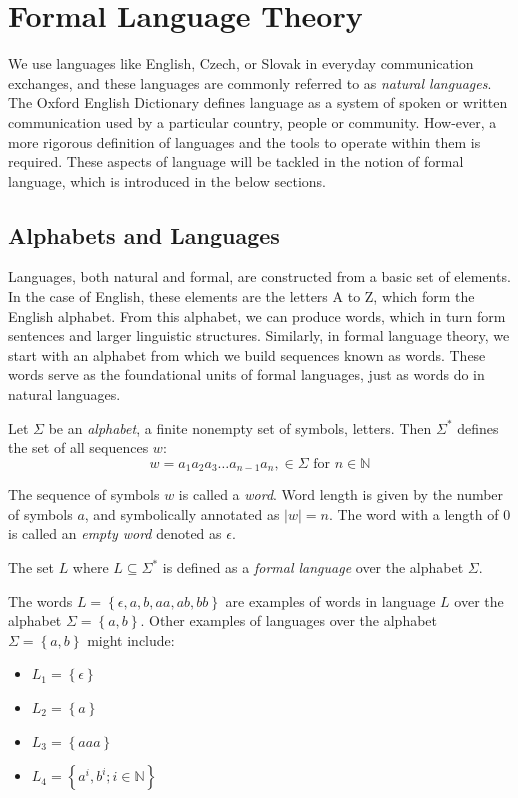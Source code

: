 \section{Formal Language Theory}
We use languages like English, Czech, or Slovak in everyday communication exchanges, and these languages are commonly referred to as \emph{natural languages}. The Oxford English Dictionary defines language as a system of spoken or written communication used by a particular country, people or community. How-ever, a more rigorous definition of languages and the tools to operate within them is required. These aspects of language will be tackled in the notion of formal language, which is introduced in the below sections.

\subsection{Alphabets and Languages}

Languages, both natural and formal, are constructed from a basic set of elements. In the case of English, these elements are the letters A to Z, which form the English alphabet. From this alphabet, we can produce words, which in turn form sentences and larger linguistic structures. Similarly, in formal language theory, we start with an alphabet from which we build sequences known as words. These words serve as the foundational units of formal languages, just as words do in natural languages.

\begin{definition}[Alphabet]\label{def:alphabet}
Let $\Sigma$ be an \emph{alphabet}, a finite nonempty set of symbols, letters. Then $\Sigma ^{*}$ defines the set of all sequences $w$:
$$w= a_1 a_2 a_3 \dots a_{n-1} a_n, \in \Sigma \text{ for } n \in \mathbb{N}$$
\end{definition}

The sequence of symbols $w$ is called a \emph{word}. Word length is given by the number of symbols $a$, and symbolically annotated as $|w| = n$. The word with a length of 0 is called an \emph{empty word} denoted as $\epsilon$.

\begin{definition}[Language]\label{def:language}
The set $L$ where $L\subseteq \Sigma^{*}$ is defined as a \emph{formal language} over the alphabet $\Sigma$. 
\end{definition}
The words $L = \left\lbrace \epsilon, a, b, aa, ab, bb \right\rbrace$ are examples of words in language $L$ over the alphabet $\Sigma=\left\lbrace a,b \right\rbrace$.
Other examples of languages over the alphabet $\Sigma=\left\lbrace a,b \right\rbrace$ might include:
\begin{itemize}
\item $L_1 = \left\lbrace \epsilon \right\rbrace$
\item $L_2 = \left\lbrace a \right\rbrace$
\item $L_3 = \left\lbrace aaa \right\rbrace$
\item $L_4 = \left\lbrace a^i,b^i; i \in \mathbb{N} \right\rbrace$
\end{itemize}




